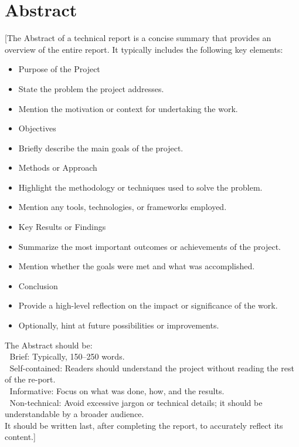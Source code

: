 \chapter*{Abstract}

[The Abstract of a technical report is a concise summary that provides an overview of the entire report. It typically includes the following key elements:
\begin{itemize}
    \item Purpose of the Project
    \item State the problem the project addresses.
    \item Mention the motivation or context for undertaking the work.
    \item Objectives
    \item Briefly describe the main goals of the project.
    \item Methods or Approach
    \item Highlight the methodology or techniques used to solve the problem.
    \item Mention any tools, technologies, or frameworks employed.
    \item Key Results or Findings
    \item Summarize the most important outcomes or achievements of the project.
    \item Mention whether the goals were met and what was accomplished.
    \item Conclusion
    \item Provide a high-level reflection on the impact or significance of the work.
    \item Optionally, hint at future possibilities or improvements.
\end{itemize}

The Abstract should be:\\
	Brief: Typically, 150–250 words.\\
	Self-contained: Readers should understand the project without reading the rest of the re-port.\\
	Informative: Focus on what was done, how, and the results.\\
	Non-technical: Avoid excessive jargon or technical details; it should be understandable by a broader audience.\\

It should be written last, after completing the report, to accurately reflect its content.]
